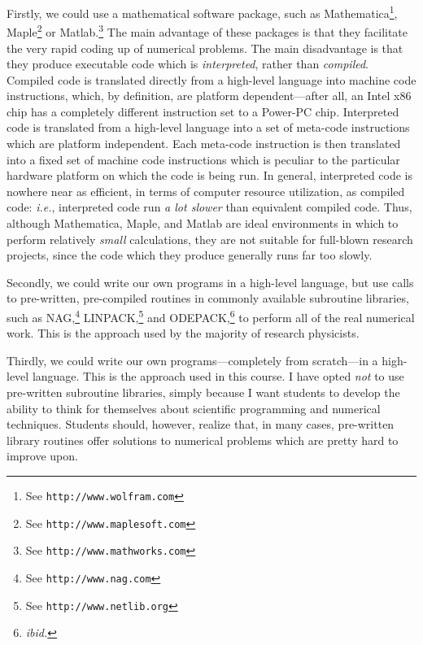 Firstly, we could use
a mathematical software package, such as {\sc Mathematica}\footnote{See
{\tt http://www.wolfram.com}}, {\sc Maple}\footnote{See {\tt http://www.maplesoft.com}}
or {\sc Matlab}.\footnote{See {\tt http://www.mathworks.com}}\@
The main advantage of these packages is that they facilitate the very rapid coding  up
of numerical problems. The main disadvantage is that they produce executable code which is {\em interpreted},
rather than {\em compiled}. Compiled code is translated directly from a high-level language into
machine code instructions, which, by definition, are platform dependent---after all, an Intel x86 chip has
a completely different instruction set to a Power-PC chip. Interpreted code is translated
from a high-level language into a set of meta-code instructions which are platform independent. 
Each meta-code instruction is then translated into a fixed set of machine code instructions which
is peculiar to the particular hardware platform on which the code is being run. In general, interpreted
code is nowhere near as efficient, in terms of computer resource utilization, as compiled code: {\em i.e.},
interpreted code run {\em a lot slower}\/ than equivalent compiled code. Thus, although 
{\sc Mathematica}, {\sc Maple}, and {\sc Matlab} are ideal environments in which to perform 
relatively {\em small}\/
calculations, they are not suitable  for full-blown research projects, since
the code which they produce generally runs far too slowly. 

Secondly, we could write our own programs in a high-level language, but use calls
to pre-written, pre-compiled routines in commonly available
  subroutine libraries, such as {\sc NAG},\footnote{See {\tt http://www.nag.com}}
 {\sc LINPACK},\footnote{See {\tt http://www.netlib.org}} and 
{\sc ODEPACK},\footnote{{\em ibid.}} to perform all of the real numerical work.
This is the approach used by the majority of research physicists.

Thirdly, we could write our own programs---completely from scratch---in a high-level language.
This is the approach used in this course. I have opted {\em not}\/ to use pre-written subroutine libraries,
simply because I want students to develop the ability to think for themselves about scientific
programming and numerical techniques. Students should, however, realize that, in many cases,
pre-written library routines offer solutions to numerical problems which are pretty hard to
improve upon.

